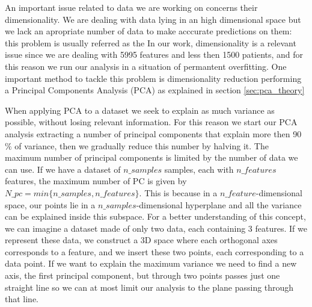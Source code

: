 \documentclass[11pt]{report}
\begin{document}
An important issue related to data we are working on concerns their dimensionality.
We are dealing with data lying in an high dimensional space but we lack an apropriate number of data to make acccurate predictions on them: this problem is usually referred as the 
In our work, dimensionality is a relevant issue since we are dealing with 5995 features and less then 1500 patients, and for this reason we run our analysis in a situation of permantent overfitting.
One important method to tackle this problem is dimensionality reduction performing a Principal Components Analysis (PCA) as explained in section \ref{sec:pca_theory}


When applying PCA to a dataset we seek to explain as much variance as possible, without losing relevant information.
For this reason we start our PCA analysis extracting a number of principal components that explain more then 90$\%$ of variance, then we gradually reduce this number by halving it.
The maximum number of principal components is limited by the number of data we can use.
If we have a dataset of $n\_samples$ samples, each with $n\_features$ features, the maximum number of PC is given by $N\_pc = min\{n\_samples, n\_features\}$.
This is because in a $n\_feature$-dimensional space, our points lie in a $n\_samples$-dimensional hyperplane and all the variance can be explained inside this subspace.
For a better understanding of this concept, we can imagine a dataset made of only two data, each containing 3 features. If we represent these data, we construct a 3D space where each orthogonal axes corresponds to a feature, and we insert these two points, each corresponding to a data point.
If we want to explain the maximum variance we need to find a new axis, the first principal component, but through two points passes just one straight line so we can at most limit our analysis to the plane passing through that line.
\end{document}
